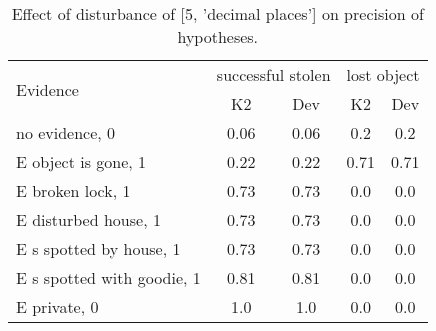 \begin{table}\begin{tabular}{l|cc|cc}\toprule\multirow{2}{*}{Evidence} & \multicolumn{2}{c}{successful stolen}& \multicolumn{2}{c}{lost object}\\& {K2} & {Dev}& {K2} & {Dev}\\\midrule
no evidence, 0 & 0.06&0.06&0.2&0.2\\E object is gone, 1 & 0.22&0.22&0.71&0.71\\E broken lock, 1 & 0.73&0.73&0.0&0.0\\E disturbed house, 1 & 0.73&0.73&0.0&0.0\\E s spotted by house, 1 & 0.73&0.73&0.0&0.0\\E s spotted with goodie, 1 & 0.81&0.81&0.0&0.0\\E private, 0 & 1.0&1.0&0.0&0.0\\\bottomrule\end{tabular}\caption{Effect of disturbance of [5, 'decimal places'] on precision of hypotheses.}\end{table}